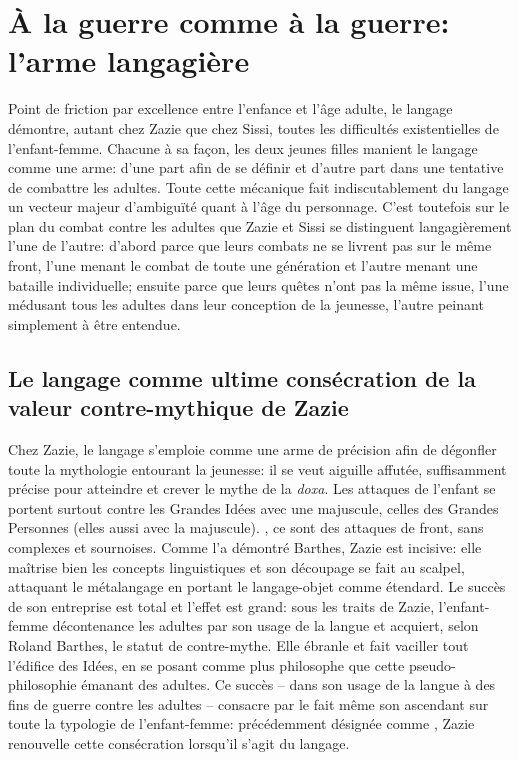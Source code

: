 \section{À la guerre comme à la guerre: l'arme langagière}
Point de friction par excellence entre l'enfance et l'âge adulte, le langage démontre, autant chez Zazie que chez Sissi, toutes les difficultés existentielles de l'enfant-femme.
Chacune à sa façon, les deux jeunes filles manient le langage comme une arme: d'une part afin de se définir et d'autre part dans une tentative de combattre les adultes.
Toute cette mécanique fait indiscutablement du langage un vecteur majeur d'ambiguïté quant à l'âge du personnage.
C'est toutefois sur le plan du combat contre les adultes que Zazie et Sissi se distinguent langagièrement l'une de l'autre: d'abord parce que leurs combats ne se livrent pas sur le même front, l'une menant le combat de toute une génération et l'autre menant une bataille individuelle; ensuite parce que leurs quêtes n'ont pas la même issue, l'une médusant tous les adultes dans leur conception de la jeunesse, l'autre peinant simplement à être entendue.

\subsection{Le langage comme ultime consécration de la valeur contre-mythique de Zazie}
Chez Zazie, le langage s'emploie comme une arme de précision afin de dégonfler toute la mythologie entourant la jeunesse: il se veut aiguille affutée, suffisamment précise pour atteindre et crever le mythe de la \textit{doxa}.
Les attaques de l'enfant se portent surtout contre les Grandes Idées avec une majuscule, celles des Grandes Personnes (elles aussi avec la majuscule).
, ce sont des attaques de front, sans complexes et sournoises.
Comme l'a démontré Barthes, Zazie est incisive: elle maîtrise bien les concepts linguistiques et son découpage se fait au scalpel, attaquant le métalangage en portant le langage-objet comme étendard.
Le succès de son entreprise est total et l'effet est grand: sous les traits de Zazie, l'enfant-femme décontenance les adultes par son usage de la langue et acquiert, selon Roland Barthes, le statut de contre-mythe.
Elle ébranle et fait vaciller tout l'édifice des Idées, en se posant comme plus philosophe que cette pseudo-philosophie émanant des adultes.
Ce succès -- dans son usage de la langue à des fins de guerre contre les adultes -- consacre par le fait même son ascendant sur toute la typologie de l'enfant-femme: précédemment désignée comme , Zazie renouvelle cette consécration lorsqu'il s'agit du langage.

